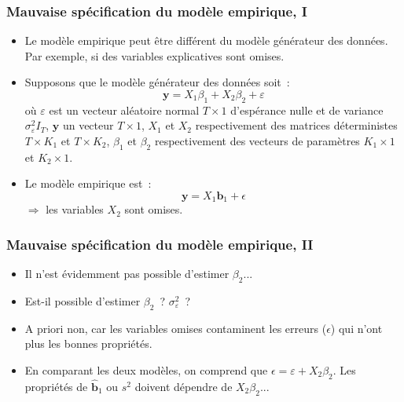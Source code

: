 \documentclass[10pt]{beamer}
\theoremstyle{plain}
\begin{document}
\begin{frame}
  \frametitle{Mauvaise spécification du modèle empirique, I}

  \begin{itemize}

  \item Le modèle empirique peut être différent du modèle générateur des données. Par exemple, si des variables explicatives sont omises.\newline

  \item Supposons que le modèle générateur des données soit~:
    \[
      \mathbf y = X_1\beta_1 + X_2\beta_2 + \varepsilon
    \]
    où $\varepsilon$ est un vecteur aléatoire normal $T\times 1$ d'espérance nulle et de variance $\sigma_{\varepsilon}^2I_T$, $\mathbf y$ un vecteur $T\times 1$, $X_1$ et $X_2$ respectivement des matrices déterministes $T\times K_1$ et $T\times K_2$, $\beta_1$ et $\beta_2$ respectivement des vecteurs de paramètres $K_1\times 1$ et $K_2\times 1$.\newline

  \item Le modèle empirique est~:
    \[
      \mathbf y = X_1\mathbf b_1 + \epsilon
    \]
    $\Rightarrow$ les variables $X_2$ sont omises.

  \end{itemize}

\end{frame}


\begin{frame}
  \frametitle{Mauvaise spécification du modèle empirique, II}

  \begin{itemize}

  \item Il n'est évidemment pas possible d'estimer $\beta_2$...\newline

  \item Est-il possible d'estimer $\beta_2$~? $\sigma_{\varepsilon}^2$~?\newline

  \item A priori non, car les variables omises contaminent les erreurs
    ($\epsilon$) qui n'ont plus les bonnes propriétés.\newline

  \item En comparant les deux modèles, on comprend
    que $\epsilon = \varepsilon + X_2\beta_2$. Les propriétés
    de $\hat{\mathbf b}_1$ ou $s^2$ doivent dépendre
    de $X_2\beta_2$...

  \end{itemize}

\end{frame}
\end{document}
